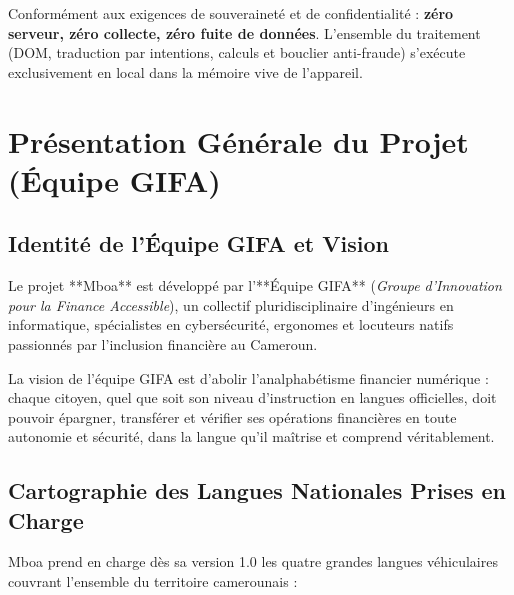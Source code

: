 \documentclass[10pt,a4paper]{article}
\begin{document}
\begin{methodbox}
\small
Conformément aux exigences de souveraineté et de confidentialité : \textbf{zéro serveur, zéro collecte, zéro fuite de données}. L'ensemble du traitement (DOM, traduction par intentions, calculs et bouclier anti-fraude) s'exécute exclusivement en local dans la mémoire vive de l'appareil.
\end{methodbox}

\newpage

\section{Présentation Générale du Projet (Équipe GIFA)}

\subsection{Identité de l'Équipe GIFA et Vision}
Le projet **Mboa** est développé par l'**Équipe GIFA** (\textit{Groupe d'Innovation pour la Finance Accessible}), un collectif pluridisciplinaire d'ingénieurs en informatique, spécialistes en cybersécurité, ergonomes et locuteurs natifs passionnés par l'inclusion financière au Cameroun. 

La vision de l'équipe GIFA est d'abolir l'analphabétisme financier numérique : chaque citoyen, quel que soit son niveau d'instruction en langues officielles, doit pouvoir épargner, transférer et vérifier ses opérations financières en toute autonomie et sécurité, dans la langue qu'il maîtrise et comprend véritablement.

\subsection{Cartographie des Langues Nationales Prises en Charge}
Mboa prend en charge dès sa version 1.0 les quatre grandes langues véhiculaires couvrant l'ensemble du territoire camerounais :
\end{document}
